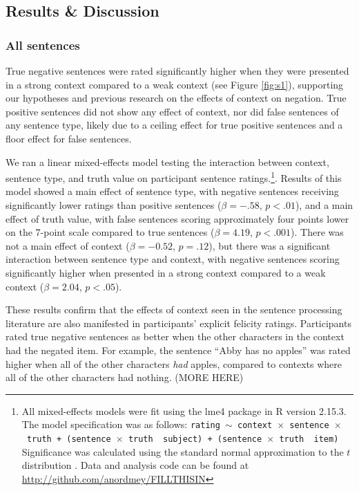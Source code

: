 \documentclass[10pt,letterpaper]{article}
\begin{document}
\subsection{Results \& Discussion}

\subsubsection{All sentences}

True negative sentences were rated significantly higher when they were presented in a strong context compared to a weak context (see Figure \ref{fig:s1}), supporting our hypotheses and previous research on the effects of context on negation.  True positive sentences did not show any effect of context, nor did false sentences of any sentence type, likely due to a ceiling effect for true positive sentences and a floor effect for false sentences.  

We ran a linear mixed-effects model testing the interaction between context, sentence type, and truth value on participant sentence ratings.\footnote{All mixed-effects models were fit using the lme4 package in R version 2.15.3.  The model specification was as follows: \texttt{rating $\sim$ context~$\times$~sentence~$\times$~truth + (sentence~$\times$~truth~\textbar~subject) +  (sentence~$\times$~truth~\textbar~item)}  Significance was calculated using the standard normal approximation to the $t$ distribution \cite{barr2013}. Data and analysis code can be found at \href{http://github.com/anordmey/FILLTHISIN}{http://github.com/anordmey/FILLTHISIN}}.  Results of this model showed a main effect of sentence type, with negative sentences receiving significantly lower ratings than positive sentences ($\beta= -.58$, $p< .01$), and a main effect of truth value, with false sentences scoring approximately four points lower on the 7-point scale compared to true sentences ($\beta= 4.19$, $p< .001$).  There was not a main effect of context ($\beta= -0.52$, $p=.12$), but there was a significant interaction between sentence type and context, with negative sentences scoring significantly higher when presented in a strong context compared to a weak context ($\beta= 2.04$, $p< .05$).  

These results confirm that the effects of context seen in the sentence processing literature are also manifested in participants' explicit felicity ratings.  Participants rated true negative sentences as better when the other characters in the context had the negated item.  For example, the sentence ``Abby has no apples'' was rated higher when all of the other characters \emph{had} apples, compared to contexts where all of the other characters had nothing.  (MORE HERE)
\end{document}
